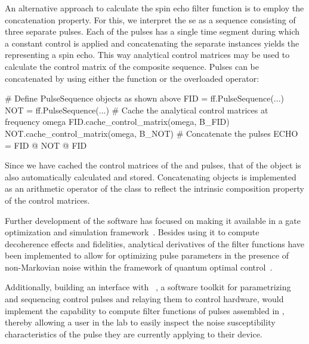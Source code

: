 An alternative approach to calculate the spin echo filter function is to employ the concatenation property.
For this, we interpret the \gls{se} as a sequence consisting of three separate pulses.
Each of the pulses has a single time segment during which a constant control is applied and concatenating the separate \pulsesequence instances yields the \pulsesequence representing a spin echo.
This way analytical control matrices may be used to calculate the control matrix of the composite sequence.
Pulses can be concatenated by using either the  function or the overloaded  operator:
\begin{pycode}
    # Define PulseSequence objects as shown above
    FID = ff.PulseSequence(...)
    NOT = ff.PulseSequence(...)
    # Cache the analytical control matrices at frequency omega
    FID.cache_control_matrix(omega, B_FID)
    NOT.cache_control_matrix(omega, B_NOT)
    # Concatenate the pulses
    ECHO = FID @ NOT @ FID
\end{pycode}
Since we have cached the control matrices of the  and  pulses, that of the  object is also automatically calculated and stored.
Concatenating \pulsesequence objects is implemented as an arithmetic operator of the class to reflect the intrinsic composition property of the control matrices.

Further development of the software has focused on making it available in a gate optimization and simulation framework~\cite{Teske2022a}.
Besides using it to compute decoherence effects and fidelities, analytical derivatives of the filter functions have been implemented to allow for optimizing pulse parameters in the presence of non-Markovian noise within the framework of quantum optimal control~\cite{Le2022,Teske2022}.

Additionally, building an interface with \qupulse~\cite{Humpohl2026,Humpohl2021}, a software toolkit for parametrizing and sequencing control pulses and relaying them to control hardware, would implement the capability to compute filter functions of pulses assembled in \qupulse, thereby allowing a user in the lab to easily inspect the noise susceptibility characteristics of the pulse they are currently applying to their device.
